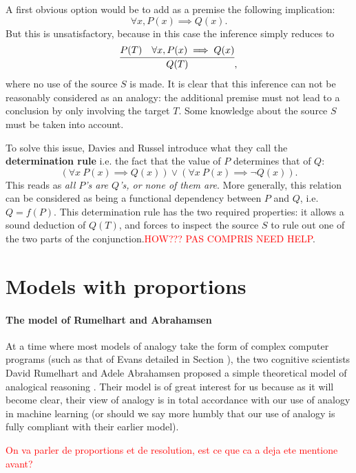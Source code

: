 A first obvious option would be to add as a premise the following implication:
$$\forall x, P(x) \implies Q(x).$$
But this is unsatisfactory, because in this case the inference simply reduces
to
$$\infer{Q(T)}{P(T) & \forall x, P(x) \implies Q(x)},$$ where no use of the
source $S$ is made. It is clear that this inference can not be reasonably
considered as an analogy: the additional premise must not lead to a conclusion
by only involving the target $T$. Some knowledge about the source $S$ must be
taken into account.

To solve this issue, Davies and Russel introduce what they call the
\textbf{determination rule} i.e. the fact that the value of $P$ determines that
of $Q$:
$$\left(\forall x ~ P(x) \implies Q(x)\right) \vee \left(\forall x ~ P(x) \implies
\neg Q(x)\right).$$
This reads as \textit{all $P$'s are $Q$'s, or none of them are}. More
generally, this relation can be considered as being a functional dependency
between $P$ and $Q$, i.e. $Q = f(P)$. This determination rule has the two
required properties: it allows a sound deduction of $Q(T)$, and forces to
inspect the source $S$ to rule out one of the two parts of the
conjunction.\textcolor{red}{HOW??? PAS COMPRIS NEED HELP}.



\section{Models with proportions}

\paragraph{The model of Rumelhart and Abrahamsen\\}
\label{SEC:rumelhart_Abrahamsen}

At a time where most models of analogy take the form of complex computer
programs (such as that of Evans detailed in Section ), the two
cognitive scientists David Rumelhart and Adele Abrahamsen proposed a simple
theoretical model of analogical reasoning \cite{RumAbr73}. Their model is of
great interest for us because as it will become clear, their view of analogy is
in total accordance with our use of analogy in machine learning (or should we
say more humbly that our use of analogy is fully compliant with their earlier
model).

\textcolor{red}{On va parler de proportions et de resolution, est ce que ca a
deja ete mentione avant?}

